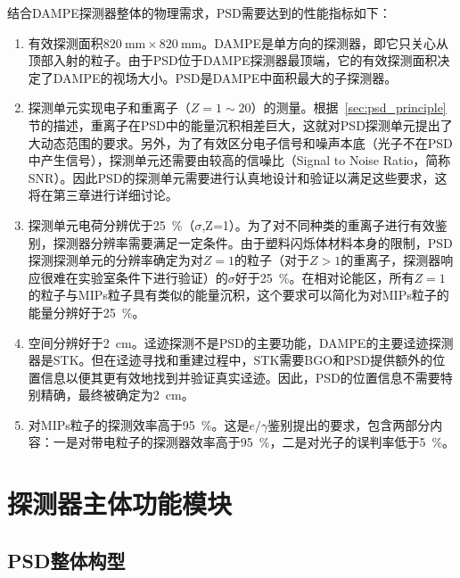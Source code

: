 结合DAMPE探测器整体的物理需求，PSD需要达到的性能指标如下：
\begin{enumerate}[noitemsep,topsep=0pt]
	\item 有效探测面积$\SI{820}{\milli\meter}\times\SI{820}{\milli\meter}$。DAMPE是单方向的探测器，即它只关心从顶部入射的粒子。由于PSD位于DAMPE探测器最顶端，它的有效探测面积决定了DAMPE的视场大小。PSD是DAMPE中面积最大的子探测器。
	\item 探测单元实现电子和重离子（$Z=1\sim20$）的测量。根据~\ref{sec:psd_principle}节的描述，重离子在PSD中的能量沉积相差巨大，这就对PSD探测单元提出了大动态范围的要求。另外，为了有效区分电子信号和噪声本底（光子不在PSD中产生信号），探测单元还需要由较高的信噪比（Signal to Noise Ratio，简称SNR）。因此PSD的探测单元需要进行认真地设计和验证以满足这些要求，这将在第三章进行详细讨论。
	\item 探测单元电荷分辨优于\SI{25}{\percent}（$\sigma$,Z=1）。为了对不同种类的重离子进行有效鉴别，探测器分辨率需要满足一定条件。由于塑料闪烁体材料本身的限制，PSD探测探测单元的分辨率确定为对$Z=1$的粒子（对于$Z>1$的重离子，探测器响应很难在实验室条件下进行验证）的$\sigma$好于\SI{25}{\percent}。在相对论能区，所有$Z=1$的粒子与MIPs粒子具有类似的能量沉积，这个要求可以简化为对MIPs粒子的能量分辨好于\SI{25}{\percent}。
	\item 空间分辨好于\SI{2}{\centi\meter}。迳迹探测不是PSD的主要功能，DAMPE的主要迳迹探测器是STK。但在迳迹寻找和重建过程中，STK需要BGO和PSD提供额外的位置信息以便其更有效地找到并验证真实迳迹。因此，PSD的位置信息不需要特别精确，最终被确定为\SI{2}{\centi\meter}。
	\item 对MIPs粒子的探测效率高于\SI{95}{\percent}。这是$e/\gamma$鉴别提出的要求，包含两部分内容：一是对带电粒子的探测器效率高于\SI{95}{\percent}，二是对光子的误判率低于\SI{5}{\percent}。
\end{enumerate}

\section{探测器主体功能模块}
\subsection{PSD整体构型}
\label{sec:psd_composition}

